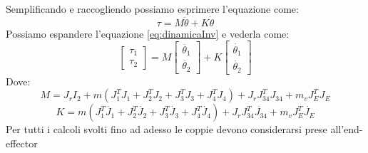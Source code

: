 Semplificando e raccogliendo possiamo esprimere l'equazione come:
\begin{equation}
    \tau = M \ddot{\theta} + K \dot{\theta}
    \label{eq:dinamicaInv}
\end{equation}
Possiamo espandere l'equazione \ref{eq:dinamicaInv} e vederla come:
\begin{equation}
    \begin{bmatrix}
    \tau_1 \\ \tau_2
    \end{bmatrix} = 
    M\begin{bmatrix}
    \ddot{\theta_1} \\ \ddot{\theta_2}
    \end{bmatrix}
    + K \begin{bmatrix}
    \dot{\theta_1} \\ \dot{\theta_2}
    \end{bmatrix}
\end{equation}
Dove:
\begin{equation}
    M = J_r I_2 + m(J_1^T J_1 + J_2^TJ_2+J_3^TJ_3+J_4^TJ_4)+J_rJ_{34}^TJ_{34} + m_vJ_E^TJ_E
    \label{eq:M}
\end{equation}
\begin{equation}
    K = m(J_1^T\dot{J_1}+J_2^T\dot{J_2}+J_3^T\dot{J_3}+J_4^T\dot{J_4})+J_rJ_{34}^T\dot{J_{34}}+m_vJ_E^T\dot{J_E}
    \label{eq:K}
\end{equation}
Per tutti i calcoli svolti fino ad adesso le coppie devono considerarsi prese all'end-effector
